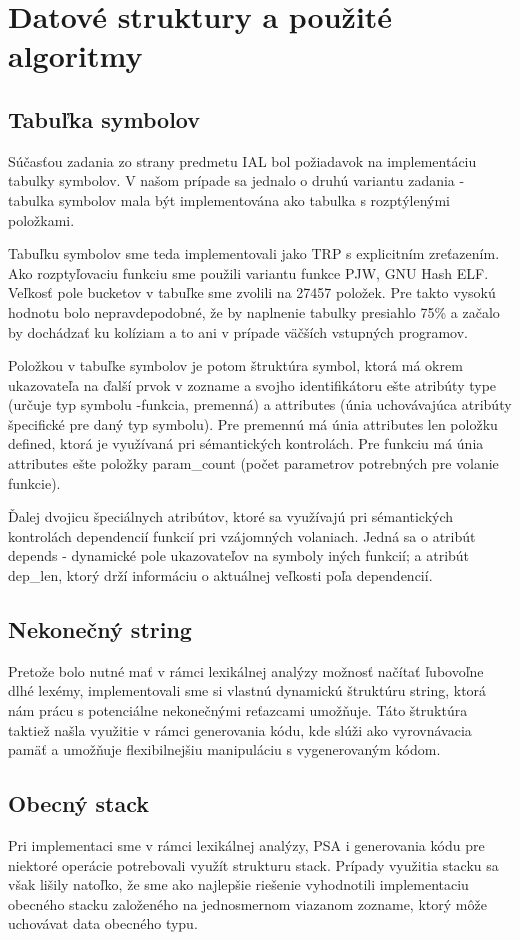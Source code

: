 \documentclass{article}
\begin{document}
	\section{Datové struktury a použité algoritmy}
	\subsection{Tabuľka symbolov}
	Súčasťou zadania zo strany predmetu IAL bol požiadavok na implementáciu tabulky symbolov. V našom prípade sa jednalo o druhú variantu zadania - tabulka symbolov mala být implementována ako tabulka s rozptýlenými položkami.
	
	Tabuľku symbolov sme teda implementovali jako TRP s explicitním zreťazením. Ako rozptyľovaciu funkciu sme použili variantu funkce PJW, GNU Hash ELF. Veľkosť pole bucketov v tabuľke sme zvolili na 27457 položek. Pre takto vysokú hodnotu bolo nepravdepodobné, že by naplnenie tabulky presiahlo 75\% a začalo by dochádzať ku kolíziam a to ani v prípade väčších vstupných programov.
	
	Položkou v tabuľke symbolov je potom štruktúra symbol, ktorá má okrem ukazovateľa na ďalší prvok v zozname a svojho identifikátoru ešte atribúty type  (určuje typ symbolu -funkcia, premenná) a attributes (únia uchovávajúca atribúty špecifické pre daný typ symbolu). Pre premennú má únia attributes len položku defined, ktorá je využívaná pri sémantických kontrolách. Pre funkciu má únia attributes ešte položky param\_count (počet parametrov potrebných pre volanie funkcie).
	
	Ďalej dvojicu  špeciálnych atribútov, ktoré sa využívajú pri sémantických kontrolách dependencií funkcií pri vzájomných volaniach. Jedná sa o atribút depends - dynamické pole ukazovateľov na symboly iných funkcií; a atribút dep\_len, ktorý drží informáciu o aktuálnej veľkosti poľa dependencií.
	
	\subsection{Nekonečný string}
	Pretože bolo nutné mať v rámci lexikálnej analýzy možnosť načítať ľubovoľne dlhé lexémy, implementovali sme si vlastnú dynamickú štruktúru string, ktorá nám prácu s potenciálne nekonečnými reťazcami umožňuje. Táto štruktúra taktiež našla využitie v rámci generovania kódu, kde slúži ako vyrovnávacia pamäť a umožňuje flexibilnejšiu manipuláciu s vygenerovaným kódom.
	\subsection{Obecný stack}
	Pri implementaci sme v rámci lexikálnej analýzy, PSA i generovania kódu pre niektoré operácie potrebovali využít strukturu stack. Prípady využitia stacku sa však lišily natoľko, že sme ako najlepšie riešenie vyhodnotili implementaciu obecného stacku založeného na jednosmernom viazanom zozname, ktorý môže uchovávat data obecného typu.
	
\end{document}
